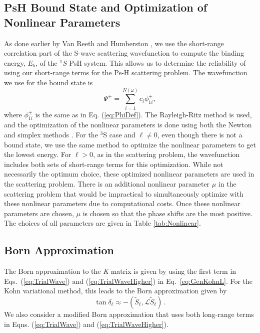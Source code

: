 \documentclass[preprint,showpacs,preprintnumbers,amsmath,amssymb,longbibliography,pra,aps]{revtex4-1}
\begin{document}

\subsection{PsH Bound State and Optimization of Nonlinear Parameters}
As done earlier by Van Reeth and Humberston \cite{VanReeth2003,VanReeth2004}, we use the short-range correlation part of the S-wave scattering wavefunction to compute the binding energy, $E_b$, of the $^1S$ PsH system. This allows us to determine the reliability of using our short-range terms for the Ps-H scattering problem. The wavefunction we use for the bound state is
\begin{equation}
\label{eq:BoundWavefn}
\Psi^\pm = \sum_{i=1}^{N(\omega)} c_i \phi_{1i}^\pm,
\end{equation}
where $\phi_{1i}^\pm$ is the same as in Eq. (\ref{eq:PhiDef}). The Rayleigh-Ritz method is used, and the optimization of the nonlinear parameters is done using both the Newton \cite{Yan1999} and simplex methods \cite{GSL}. For the $^3$S case and $\ell \neq 0$, even though there is not a bound state, we use the same method to optimize the nonlinear parameters to get the lowest energy. For $\ell > 0$, as in the scattering problem, the wavefunction includes both sets of short-range terms for this optimization. While not necessarily the optimum choice, these optimized nonlinear parameters are used in the scattering problem. There is an additional nonlinear parameter $\mu$ in the scattering problem that would be impractical to simultaneously optimize with these nonlinear parameters due to computational costs. Once these nonlinear parameters are chosen, $\mu$ is chosen so that the phase shifts are the most positive. The choices of all parameters are given in Table \ref{tab:Nonlinear}.

\subsection{Born Approximation}
The Born approximation to the \emph{K} matrix \cite{Bransden2003} is given by using the first term in Eqs.~(\ref{eq:TrialWave}) and (\ref{eq:TrialWaveHigher}) in Eq.~\ref{eq:GenKohnL}. For the Kohn variational method, this leads to the Born approximation given by
\begin{equation}
\label{eq:Born}
\tan\delta_\ell \approx -(\widetilde{S}_\ell,\mathcal{L}\widetilde{S}_\ell )\, .
\end{equation}
We also consider a modified Born approximation that uses both long-range terms in Eqns. (\ref{eq:TrialWave}) and (\ref{eq:TrialWaveHigher}).
\end{document}

